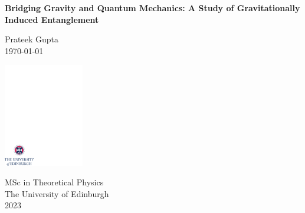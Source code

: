 \documentclass[12pt,a4paper]{report}
\theoremstyle{plain}
\theoremstyle{definition}
\theoremstyle{remark}
\begin{document}
\thispagestyle{empty}

%

\parindent=0pt          %
\parskip=5pt            %


\vspace*{0.1\textheight}

\begin{center}
        \huge{\bfseries Bridging Gravity and Quantum Mechanics: A Study of Gravitationally Induced Entanglement}%
\end{center}

\medskip

\begin{center}
        \Large{Prateek Gupta}\\  %
        \medskip
        \large{\today}  %
\end{center}


\vspace*{0.25\textheight}

\begin{center}
        \includegraphics[width=35mm]{crest.pdf}
\end{center}

\medskip

\begin{center}

\large{
  MSc in Theoretical Physics\\[0.8ex]
  The University of Edinburgh\\[0.8ex]
  2023}

\end{center}
\newpage
{}
\end{document}
